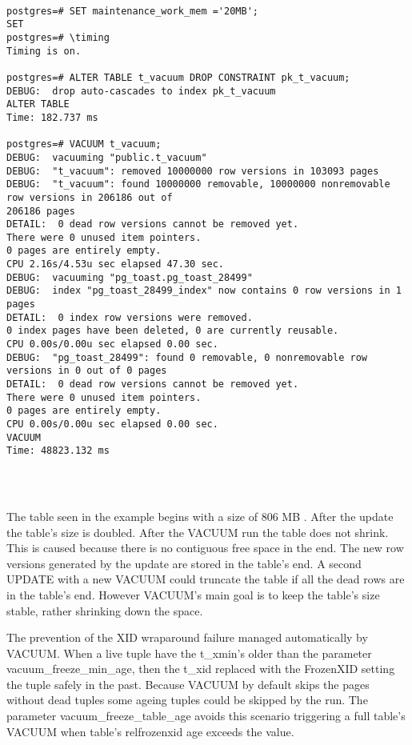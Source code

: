 \begin{lstlisting}[style=pgsql]

postgres=# SET maintenance_work_mem ='20MB';
SET
postgres=# \timing
Timing is on.

postgres=# ALTER TABLE t_vacuum DROP CONSTRAINT pk_t_vacuum;
DEBUG:  drop auto-cascades to index pk_t_vacuum
ALTER TABLE
Time: 182.737 ms

postgres=# VACUUM t_vacuum;
DEBUG:  vacuuming "public.t_vacuum"
DEBUG:  "t_vacuum": removed 10000000 row versions in 103093 pages
DEBUG:  "t_vacuum": found 10000000 removable, 10000000 nonremovable row versions in 206186 out of 
206186 pages
DETAIL:  0 dead row versions cannot be removed yet.
There were 0 unused item pointers.
0 pages are entirely empty.
CPU 2.16s/4.53u sec elapsed 47.30 sec.
DEBUG:  vacuuming "pg_toast.pg_toast_28499"
DEBUG:  index "pg_toast_28499_index" now contains 0 row versions in 1 pages
DETAIL:  0 index row versions were removed.
0 index pages have been deleted, 0 are currently reusable.
CPU 0.00s/0.00u sec elapsed 0.00 sec.
DEBUG:  "pg_toast_28499": found 0 removable, 0 nonremovable row versions in 0 out of 0 pages
DETAIL:  0 dead row versions cannot be removed yet.
There were 0 unused item pointers.
0 pages are entirely empty.
CPU 0.00s/0.00u sec elapsed 0.00 sec.
VACUUM
Time: 48823.132 ms




\end{lstlisting}

The table seen in the example begins with a size of 806 MB . After the update the table's size is doubled. 
After the VACUUM run the table does not shrink. This is caused because there is no contiguous free space in 
the end. The new row versions generated by the update are stored in the table's end. A second UPDATE 
with a new VACUUM could truncate the table if all the dead rows are in the table's end. However 
VACUUM's main goal is to keep the table's size stable, rather shrinking down the space.\newline

The prevention of the XID wraparound failure managed automatically by VACUUM. When a live tuple have the 
t\_xmin's older than the parameter vacuum\_freeze\_min\_age, then the t\_xid replaced with the 
FrozenXID setting the tuple safely in the past. Because VACUUM by default skips the pages without dead 
tuples some ageing tuples could be skipped by the run. The parameter vacuum\_freeze\_table\_age avoids 
this scenario triggering a full table's VACUUM when table's relfrozenxid age exceeds the value.\newline

